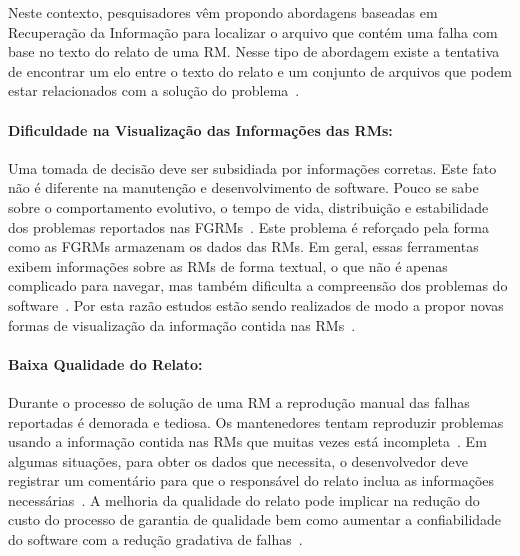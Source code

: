 Neste contexto, pesquisadores vêm propondo abordagens baseadas em Recuperação da
Informação para localizar o arquivo que contém uma falha com base no texto do
relato de uma RM\@. Nesse tipo de abordagem existe a tentativa de encontrar um
elo entre o texto do relato e um conjunto de arquivos que podem estar
relacionados com a solução do problema~\cite{Wong:2014:BBF:2705615.2706096}.

\paragraph{Dificuldade na Visualização das Informações das RMs:}

Uma tomada de decisão deve ser subsidiada por informações corretas. Este fato
não é diferente na manutenção e desenvolvimento de software. Pouco se sabe sobre
o comportamento evolutivo, o tempo de vida, distribuição e estabilidade dos
problemas reportados nas FGRMs~\cite{hora2012bug}. Este problema é reforçado
pela forma como as FGRMs armazenam os dados das RMs. Em geral, essas ferramentas
exibem informações sobre as RMs de forma textual, o que não é apenas complicado
para navegar, mas também dificulta a compreensão dos problemas do
software~\cite{dal2014bug}. Por esta razão estudos estão sendo realizados de
modo a propor novas formas de visualização da informação contida nas
RMs~\cite{takama2013application,hora2012bug}.

\paragraph{Baixa Qualidade do Relato:}

Durante o processo de solução de uma RM a reprodução manual das falhas
reportadas é demorada e tediosa. Os mantenedores tentam reproduzir problemas
usando a informação contida nas RMs que muitas vezes está
incompleta~\cite{White:2015:GRR:2820282.2820291}. Em algumas situações, para
obter os dados que necessita, o desenvolvedor deve registrar um comentário para
que o responsável do relato inclua as informações necessárias~\cite{5070993}. A
melhoria da qualidade do relato pode implicar na redução do custo do processo de
garantia de qualidade bem como aumentar a confiabilidade do software com a
redução gradativa de falhas~\cite{Tu:2014:MQI:2677832.2677844}.


